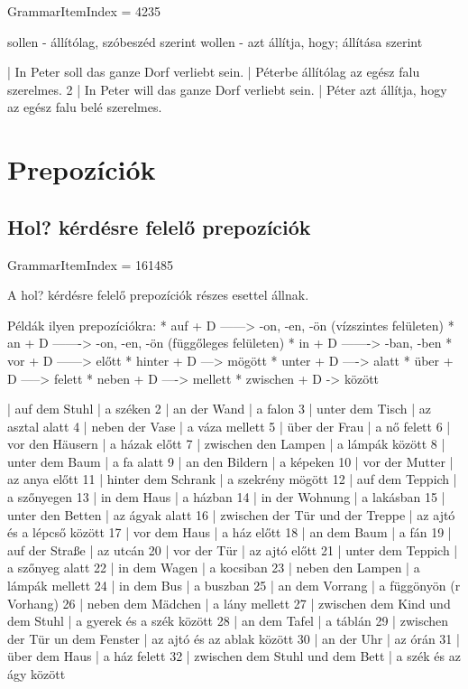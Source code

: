 \documentclass{article}
\newenvironment{desc}{\verbatim}{\endverbatim}
\newenvironment{exmp}{\verbatim}{\endverbatim}
\begin{document}
GrammarItemIndex = 4235

\begin{desc}

sollen - állítólag, szóbeszéd szerint
wollen - azt állítja, hogy; állítása szerint

\end{desc}

\begin{exmp}
1 | In Peter soll das ganze Dorf verliebt sein. | Péterbe állítólag az egész falu szerelmes.
2 | In Peter will das ganze Dorf verliebt sein. | Péter azt állítja, hogy az egész falu belé szerelmes.
\end{exmp}

\section{Prepozíciók}

\subsection{Hol? kérdésre felelő prepozíciók}

GrammarItemIndex = 161485

\begin{desc}
A hol? kérdésre felelő prepozíciók részes esettel állnak.

Példák ilyen prepozíciókra:
* auf + D ------> -on, -en, -ön (vízszintes felületen)
* an + D -------> -on, -en, -ön (függőleges felületen)
* in + D -------> -ban, -ben
* vor + D ------> előtt
* hinter + D ---> mögött
* unter + D ----> alatt
* über + D -----> felett
* neben + D ----> mellett
* zwischen + D -> között
\end{desc}

\begin{exmp}
1 | auf dem Stuhl | a széken
2 | an der Wand | a falon
3 | unter dem Tisch | az asztal alatt
4 | neben der Vase | a váza mellett
5 | über der Frau | a nő felett
6 | vor den Häusern | a házak előtt
7 | zwischen den Lampen | a lámpák között
8 | unter dem Baum | a fa alatt
9 | an den Bildern | a képeken
10 | vor der Mutter | az anya előtt
11 | hinter dem Schrank | a szekrény mögött
12 | auf dem Teppich | a szőnyegen
13 | in dem Haus | a házban
14 | in der Wohnung | a lakásban
15 | unter den Betten | az ágyak alatt
16 | zwischen der Tür und der Treppe | az ajtó és a lépcső között
17 | vor dem Haus | a ház előtt
18 | an dem Baum | a fán
19 | auf der Straße | az utcán
20 | vor der Tür | az ajtó előtt
21 | unter dem Teppich | a szőnyeg alatt
22 | in dem Wagen | a kocsiban
23 | neben den Lampen | a lámpák mellett
24 | in dem Bus | a buszban
25 | an dem Vorrang | a függönyön (r Vorhang)
26 | neben dem Mädchen | a lány mellett
27 | zwischen dem Kind und dem Stuhl | a gyerek és a szék között
28 | an dem Tafel | a táblán
29 | zwischen der Tür un dem Fenster | az ajtó és az ablak között
30 | an der Uhr | az órán
31 | über dem Haus | a ház felett
32 | zwischen dem Stuhl und dem Bett | a szék és az ágy között
\end{exmp}
\end{document}
